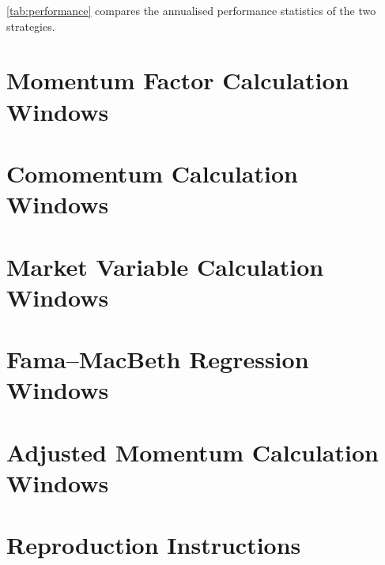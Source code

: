 \documentclass[10pt]{article}
\begin{document}
\autoref{tab:performance} compares the annualised performance statistics of the two strategies.




\newpage
{}



\newpage
\appendix
\section{Momentum Factor Calculation Windows}
\label{sec:appendix-momentum}



\section{Comomentum Calculation Windows}
\label{sec:appendix-comomentum}



\clearpage
\section{Market Variable Calculation Windows}
\label{sec:appendix-mktvar}



\clearpage
\section{Fama--MacBeth Regression Windows}
\label{sec:appendix-famamacbeth}



\section{Adjusted Momentum Calculation Windows}
\label{sec:appendix-adjmom}



\clearpage
\section{Reproduction Instructions}
\label{sec:appendix-reproduction}
\end{document}
